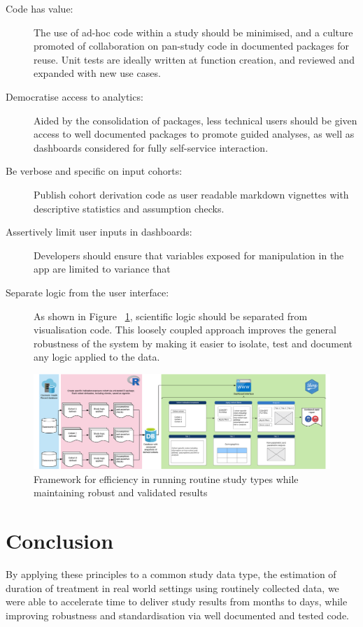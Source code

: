 \documentclass{amia}
\begin{document}
\begin{description}
  \item[Code has value:] The use of ad-hoc code within a study should be minimised, and a culture promoted of collaboration on pan-study code in documented packages for reuse. Unit tests are ideally written at function creation, and reviewed and expanded with new use cases.
  \item[Democratise access to analytics:] Aided by the consolidation of packages, less technical users should be given access to well documented packages to promote guided analyses, as well as dashboards considered for fully self-service interaction.
  \item[Be verbose and specific on input cohorts:] Publish cohort derivation code as user readable markdown vignettes with descriptive statistics and assumption checks.
  \item[Assertively limit user inputs in dashboards:] Developers should ensure that variables exposed for manipulation in the app are limited to variance that 
  \item[Separate logic from the user interface:] As shown in Figure ~\ref{fig1}, scientific logic should be separated from visualisation code. This loosely coupled approach improves the general robustness of the system by making it easier to isolate, test and document any logic applied to the data.
\end{description}


\begin{figure}[h!]
\centering
\includegraphics[width=\textwidth]{pics/abstract_image.png}
\caption{Framework for efficiency in running routine study types while maintaining robust and validated results}
\label{fig1}
\end{figure}

\section*{Conclusion}
By applying these principles to a common study data type, the estimation of duration of treatment in real world settings using routinely collected data, we were able to accelerate time to deliver study results from months to days, while improving robustness and standardisation via well documented and tested code.
\end{document}
